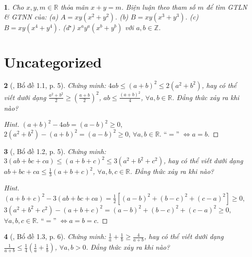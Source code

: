 \documentclass{article}
\newtheorem{baitoan}{}
\begin{document}
\begin{baitoan}
	Cho $x,y,m\in\mathbb{R}$ thỏa mãn $x + y = m$. Biện luận theo tham số $m$ để tìm {\rm GTLN} \& {\rm GTNN} của: (a) $A = xy(x^2 + y^2)$. (b) $B = xy(x^3 + y^3)$. (c) $B = xy(x^4 + y^4)$. (d${}^\star$) $x^ay^a(x^b + y^b)$ với $a,b\in\mathbb{Z}$. 
\end{baitoan}


\section{Uncategorized}

\begin{baitoan}[\cite{Son_Nghiep_Trung_Can_bdt}, Bổ đề 1.1, p. 5]
	Chứng minh: $4ab\le(a + b)^2\le2(a^2 + b^2)$, hay có thể viết dưới dạng $\frac{a^2 + b^2}{2}\ge\left(\frac{a + b}{2}\right)^2$, $ab\le\frac{(a + b)^2}{4}$, $\forall a,b\in\mathbb{R}$. Đẳng thức xảy ra khi nào?
\end{baitoan}

\begin{proof}[Hint]
	$(a + b)^2 - 4ab = (a - b)^2\ge 0$, $2(a^2 + b^2) - (a + b)^2 = (a - b)^2\ge 0$, $\forall a,b\in\mathbb{R}$. ``$=$'' $\Leftrightarrow a = b$.
\end{proof}

\begin{baitoan}[\cite{Son_Nghiep_Trung_Can_bdt}, Bổ đề 1.2, p. 5]
	Chứng minh: $3(ab + bc + ca)\le(a + b + c)^2\le3(a^2 + b^2 + c^2)$, hay có thể viết dưới dạng $ab + bc + ca\le\frac{1}{3}(a + b + c)^2$, $\forall a,b,c\in\mathbb{R}$. Đẳng thức xảy ra khi nào?
\end{baitoan}

\begin{proof}[Hint]
	$(a + b + c)^2 - 3(ab + bc + ca) = \frac{1}{2}\left[(a - b)^2 + (b - c)^2 + (c - a)^2\right]\ge 0$, $3(a^2 + b^2 + c^2) - (a + b + c)^2 = (a - b)^2 + (b - c)^2 + (c - a)^2\ge 0$, $\forall a,b,c\in\mathbb{R}$. ``$=$'' $\Leftrightarrow a = b = c$.
\end{proof}

\begin{baitoan}[\cite{Son_Nghiep_Trung_Can_bdt}, Bổ đề 1.3, p. 6]
	Chứng minh: $\frac{1}{a} + \frac{1}{b}\ge\frac{4}{a + b}$, hay có thể viết dưới dạng $\frac{1}{a + b}\le\frac{1}{4}\left(\frac{1}{a} + \frac{1}{b}\right)$, $\forall a,b > 0$. Đẳng thức xảy ra khi nào?
\end{baitoan}
\end{document}
